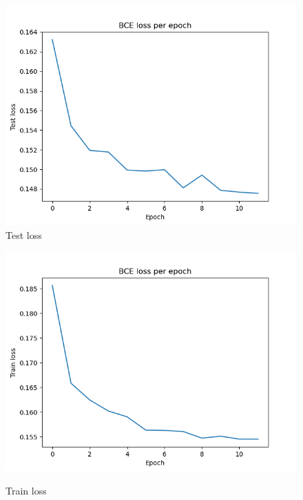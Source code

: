 \documentclass[12pt, letterpaper, twoside]{article}
\begin{document}
\begin{figure}[ht]
\begin{minipage}[b]{0.5\linewidth}
  \end{minipage} 
  \begin{minipage}[b]{0.5\linewidth}
    \centering
    \includegraphics[scale=0.5]{"Task3_testlosses.png"}\\ 
    \caption{Test loss} 
    \vspace{4ex}
  \end{minipage}%
  \begin{minipage}[b]{0.5\linewidth}
    \centering
    \includegraphics[scale=0.5]{"Task3_trainlosses.png"}\\
    \caption{Train loss} 
    \vspace{4ex}
  \end{minipage} 
\end{figure}
\end{document}
